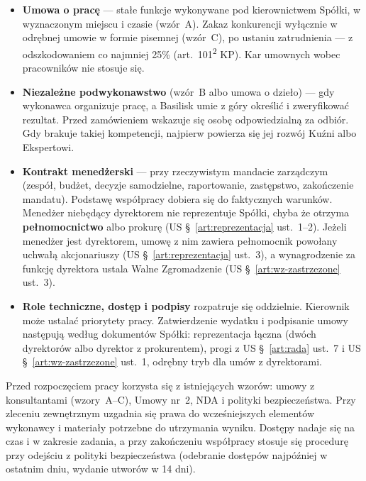 \documentclass[11pt,a4paper]{report}
\newcommand{\US}[1]{US §~#1}
\begin{document}
\begin{itemize}
  \item \textbf{Umowa o pracę} --- stałe funkcje wykonywane pod kierownictwem Spółki, w wyznaczonym miejscu i czasie (wzór~A). Zakaz konkurencji wyłącznie w odrębnej umowie w formie pisemnej (wzór~C), po ustaniu zatrudnienia --- z odszkodowaniem co najmniej 25\% (art.~101\textsuperscript{2} KP). Kar umownych wobec pracowników nie stosuje się.
  \item \textbf{Niezależne podwykonawstwo} (wzór~B albo umowa o dzieło) --- gdy wykonawca organizuje pracę, a Basilisk umie z góry określić i zweryfikować rezultat. Przed zamówieniem wskazuje się osobę odpowiedzialną za odbiór. Gdy brakuje takiej kompetencji, najpierw powierza się jej rozwój Kuźni albo Ekspertowi.
  \item \textbf{Kontrakt menedżerski} --- przy rzeczywistym mandacie zarządczym (zespół, budżet, decyzje samodzielne, raportowanie, zastępstwo, zakończenie mandatu). Podstawę współpracy dobiera się do faktycznych warunków. Menedżer niebędący dyrektorem nie reprezentuje Spółki, chyba że otrzyma \textbf{pełnomocnictwo} albo prokurę (\US{\ref{art:reprezentacja} ust.~1--2}). Jeżeli menedżer jest dyrektorem, umowę z nim zawiera pełnomocnik powołany uchwałą akcjonariuszy (\US{\ref{art:reprezentacja} ust.~3}), a wynagrodzenie za funkcję dyrektora ustala Walne Zgromadzenie (\US{\ref{art:wz-zastrzezone} ust.~3}).
  \item \textbf{Role techniczne, dostęp i podpisy} rozpatruje się oddzielnie. Kierownik może ustalać priorytety pracy. Zatwierdzenie wydatku i podpisanie umowy następują według dokumentów Spółki: reprezentacja łączna (dwóch dyrektorów albo dyrektor z prokurentem), progi z \US{\ref{art:rada} ust.~7} i \US{\ref{art:wz-zastrzezone} ust.~1}, odrębny tryb dla umów z dyrektorami.
\end{itemize}

Przed rozpoczęciem pracy korzysta się z istniejących wzorów: umowy z konsultantami (wzory~A--C), Umowy nr~2, NDA i polityki bezpieczeństwa. Przy zleceniu zewnętrznym uzgadnia się prawa do wcześniejszych elementów wykonawcy i materiały potrzebne do utrzymania wyniku. Dostępy nadaje się na czas i w zakresie zadania, a przy zakończeniu współpracy stosuje się procedurę przy odejściu z polityki bezpieczeństwa (odebranie dostępów najpóźniej w ostatnim dniu, wydanie utworów w 14 dni).
\end{document}
